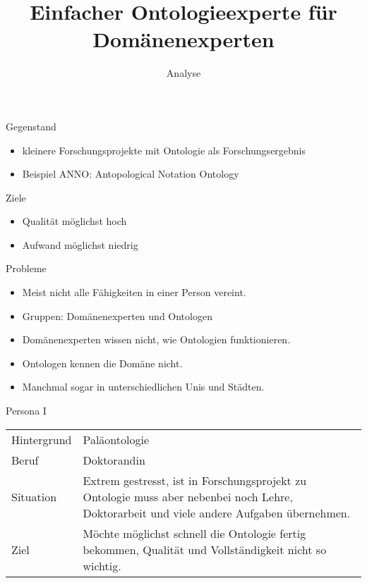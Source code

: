 \documentclass[14pt,aspectratio=1610]{beamer}
\title{Einfacher Ontologieexperte für Domänenexperten}
\subtitle{Analyse}
\begin{document}
\begin{frame}
\titlepage
\end{frame}

\begin{frame}{Gegenstand}
\begin{itemize}
\item kleinere Forschungsprojekte mit Ontologie als Forschungsergebnis
\item Beispiel ANNO: Antopological Notation Ontology
\end{itemize}
\end{frame}

\begin{frame}{Ziele}
\begin{itemize}
\item Qualität möglichst hoch
\item Aufwand möglichst niedrig
\end{itemize}
\end{frame}

\begin{frame}{Probleme}
\begin{itemize}
\item Meist nicht alle Fähigkeiten in einer Person vereint.
\item Gruppen: Domänenexperten und Ontologen
\item Domänenexperten wissen nicht, wie Ontologien funktionieren.
\item Ontologen kennen die Domäne nicht.
\item Manchmal sogar in unterschiedlichen Unis und Städten.
\end{itemize}
\end{frame}

\begin{frame}[fragile]{Persona I}
\begin{tabulary}{\textwidth}{lL}
Hintergrund		&Paläontologie\\
Beruf					&Doktorandin\\
Situation			&Extrem gestresst, ist in Forschungsprojekt zu Ontologie muss aber nebenbei noch Lehre, Doktorarbeit und viele andere Aufgaben übernehmen.\\
Ziel					&Möchte möglichst schnell die Ontologie fertig bekommen, Qualität und Vollständigkeit nicht so wichtig.\\
\end{tabulary}
\end{frame}
\end{document}
